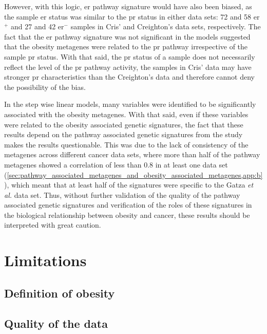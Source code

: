 However, with this logic, \gls{er} pathway signature would have also been biased, as the  sample  \gls{er} status was similar to the \gls{pr} status in either data sets: 72 and 58 \gls{er}$^+$ and 27 and 42 \gls{er}$^-$ samples in Cris' and Creighton's data sets, respectively.
The fact that the \gls{er} pathway signature was not significant in the models suggested that the obesity metagenes were related to the \gls{pr} pathway irrespective of the sample \gls{pr} status.
With that said, the \gls{pr} status of a sample does not necessarily reflect the level of the \gls{pr} pathway activity, the samples in Cris' data may have stronger \gls{pr} characteristics than the Creighton's data and therefore cannot deny the possibility of the bias.

In the step wise linear models, many variables were identified to be significantly associated with the obesity metagenes.
With that said, even if these variables were related to the obesity associated genetic signatures, the fact that these results depend on the pathway associated genetic signatures from the \citet{Gatza2010a} study makes the results questionable.
This was due to the lack of consistency of the metagenes across different cancer data sets, where more than half of the pathway metagenes showed a correlation of less than 0.8 in at least one data set (\cref{sec:pathway_associated_metagenes_and_obesity_associated_metagenes,app:b}), which meant that at least half of the signatures were specific to the Gatza \textit{et al.} data set.
Thus, without further validation of the quality of the pathway associated genetic signatures and verification of the roles of these signatures in the biological relationship between obesity and cancer, these results should be interpreted with great caution.

\section{Limitations}
\label{sec:limitations}

\subsection{Definition of obesity}
\label{sub:definition_of_obesity}






\subsection{Quality of the data}
\label{sub:quality_of_the_data}


